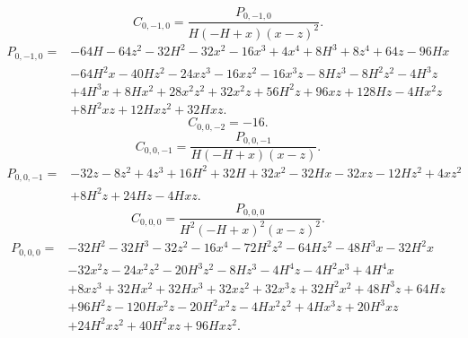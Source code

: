 \begin{equation}
C_{0,-1,0}=\frac{P_{0,-1,0}}{H \left(- H + x\right) \left(x - z\right)^{2}}.
\end{equation}
\begin{equation}
\begin{aligned}
P_{0,-1,0}={}& - 64 H - 64 z^{2} - 32 H^{2} - 32 x^{2} - 16 x^{3} + 4 x^{4} + 8 H^{3} + 8 z^{4} + 64 z - 96 H x\\
& - 64 H^{2} x - 40 H z^{2} - 24 x z^{3} - 16 x z^{2} - 16 x^{3} z - 8 H z^{3} - 8 H^{2} z^{2} - 4 H^{3} z\\
& + 4 H^{3} x + 8 H x^{2} + 28 x^{2} z^{2} + 32 x^{2} z + 56 H^{2} z + 96 x z + 128 H z - 4 H x^{2} z\\
& + 8 H^{2} x z + 12 H x z^{2} + 32 H x z.
\end{aligned}
\end{equation}
\begin{equation}
C_{0,0,-2}=-16.
\end{equation}
\begin{equation}
C_{0,0,-1}=\frac{P_{0,0,-1}}{H \left(- H + x\right) \left(x - z\right)}.
\end{equation}
\begin{equation}
\begin{aligned}
P_{0,0,-1}={}& - 32 z - 8 z^{2} + 4 z^{3} + 16 H^{2} + 32 H + 32 x^{2} - 32 H x - 32 x z - 12 H z^{2} + 4 x z^{2}\\
& + 8 H^{2} z + 24 H z - 4 H x z.
\end{aligned}
\end{equation}
\begin{equation}
C_{0,0,0}=\frac{P_{0,0,0}}{H^{2} \left(- H + x\right)^{2} \left(x - z\right)^{2}}.
\end{equation}
\begin{equation}
\begin{aligned}
P_{0,0,0}={}& - 32 H^{2} - 32 H^{3} - 32 z^{2} - 16 x^{4} - 72 H^{2} z^{2} - 64 H z^{2} - 48 H^{3} x - 32 H^{2} x\\
& - 32 x^{2} z - 24 x^{2} z^{2} - 20 H^{3} z^{2} - 8 H z^{3} - 4 H^{4} z - 4 H^{2} x^{3} + 4 H^{4} x\\
& + 8 x z^{3} + 32 H x^{2} + 32 H x^{3} + 32 x z^{2} + 32 x^{3} z + 32 H^{2} x^{2} + 48 H^{3} z + 64 H z\\
& + 96 H^{2} z - 120 H x^{2} z - 20 H^{2} x^{2} z - 4 H x^{2} z^{2} + 4 H x^{3} z + 20 H^{3} x z\\
& + 24 H^{2} x z^{2} + 40 H^{2} x z + 96 H x z^{2}.
\end{aligned}
\end{equation}
